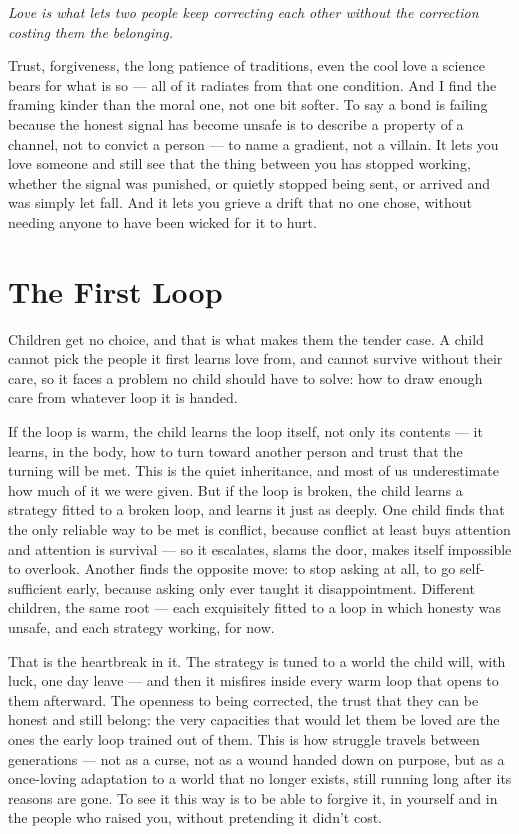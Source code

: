 \documentclass[12pt, a4paper]{article}
\begin{document}
\begin{center}
\textit{Love is what lets two people keep correcting each other without the correction costing them the belonging.}
\end{center}

Trust, forgiveness, the long patience of traditions, even the cool love a science bears for what is so — all of it radiates from that one condition. And I find the framing kinder than the moral one, not one bit softer. To say a bond is failing because the honest signal has become unsafe is to describe a property of a channel, not to convict a person — to name a gradient, not a villain. It lets you love someone and still see that the thing between you has stopped working, whether the signal was punished, or quietly stopped being sent, or arrived and was simply let fall. And it lets you grieve a drift that no one chose, without needing anyone to have been wicked for it to hurt.

\section*{The First Loop}
Children get no choice, and that is what makes them the tender case. A child cannot pick the people it first learns love from, and cannot survive without their care, so it faces a problem no child should have to solve: how to draw enough care from whatever loop it is handed.

If the loop is warm, the child learns the loop itself, not only its contents — it learns, in the body, how to turn toward another person and trust that the turning will be met. This is the quiet inheritance, and most of us underestimate how much of it we were given. But if the loop is broken, the child learns a strategy fitted to a broken loop, and learns it just as deeply. One child finds that the only reliable way to be met is conflict, because conflict at least buys attention and attention is survival — so it escalates, slams the door, makes itself impossible to overlook. Another finds the opposite move: to stop asking at all, to go self-sufficient early, because asking only ever taught it disappointment. Different children, the same root — each exquisitely fitted to a loop in which honesty was unsafe, and each strategy working, for now.

That is the heartbreak in it. The strategy is tuned to a world the child will, with luck, one day leave — and then it misfires inside every warm loop that opens to them afterward. The openness to being corrected, the trust that they can be honest and still belong: the very capacities that would let them be loved are the ones the early loop trained out of them. This is how struggle travels between generations — not as a curse, not as a wound handed down on purpose, but as a once-loving adaptation to a world that no longer exists, still running long after its reasons are gone. To see it this way is to be able to forgive it, in yourself and in the people who raised you, without pretending it didn't cost.
\end{document}
